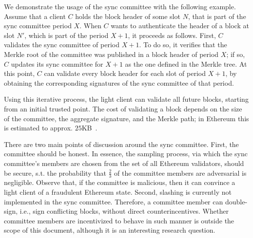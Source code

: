 We demonstrate the usage of the sync committee with the following example.
Assume that a client $C$ holds the block header of some slot $N$, that is part
of the sync committee period $X$.  When $C$ wants to authenticate the header of
a block at slot $N'$, which is part of the period $X+1$, it proceeds as
follows.  First, $C$ validates the sync committee of period $X+1$. To do so, it
verifies that the Merkle root of the committee was published in a block header
of period $X$; if so, $C$ updates its sync committee for $X+1$ as the one
defined in the Merkle tree. At this point, $C$ can validate every block header
for each slot of period $X+1$, by obtaining the corresponding signatures of the
sync committee of that period.

Using this iterative process, the light client can validate all future blocks,
starting from an initial trusted point. The cost of validating a block depends
on the size of the committee, the aggregate signature, and the Merkle path; in
Ethereum this is estimated to approx. $25$KB~\cite{sync-committee}.

There are two main points of discussion around the sync committee.
%
First, the committee should be honest. In essence, the sampling process, via
which the sync committee's members are chosen from the set of all Ethereum
validators, should be secure, s.t. the probability that $\frac{2}{3}$ of the
committee members are adversarial is negligible. Observe that, if the committee
is malicious, then it can convince a light client of a fraudulent Ethereum
state. 
%
Second, slashing is currently not implemented in the sync committee. Therefore,
a committee member can double-sign, i.e., sign conflicting blocks, without
direct counterincentives. Whether committee members are incentivized to behave
in such manner is outside the scope of this document, although it is an
interesting research question.
